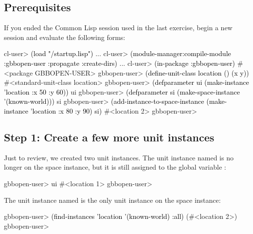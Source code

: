 \documentclass[10pt,twoside,english,pdftex]{article}
\begin{document}
\fndocrule

\subsection*{Prerequisites}

%
%
%
If you ended the Common Lisp session used in the last exercise, begin a new
session and evaluate the following forms:
%
\W\supp
\begin{example}
\textcolor{darkergray}{%
  cl-user> \textcolor{black}{(load "/startup.lisp")}
     ...
  cl-user> \textcolor{black}{(module-manager:compile-module :gbbopen-user :propagate :create-dirs)}
     ...
  cl-user> \textcolor{black}{(in-package :gbbopen-user)}
  #<package GBBOPEN-USER>
  gbbopen-user> \textcolor{black}{(define-unit-class location ()
                   (x y))}
  #<standard-unit-class location>
  gbbopen-user> \textcolor{black}{(defparameter ui (make-instance 'location :x 50 :y 60))}
  ui
  gbbopen-user> \textcolor{black}{(defparameter si (make-space-instance '(known-world)))}
  si
  gbbopen-user> \textcolor{black}{(add-instance-to-space-instance 
                   (make-instance 'location :x 80 :y 90)
                   si)}
  #<location 2>
  gbbopen-user>}
\end{example}

\subsection*{Step 1: Create a few more unit instances}

Just to review, we created two  unit instances.  The
unit instance named  is no longer on the 
space instance, but it is still assigned to the global variable :
%
%
\W\supp
\begin{example}
\textcolor{darkergray}{%
  gbbopen-user> \textcolor{black}{ui}
  #<location 1> 
  gbbopen-user>}
\end{example}
%
The  unit instance named  is the only
 unit instance on the  space
instance:
%
%
\W\supp\notpretop
\begin{example}
\textcolor{darkergray}{%
  gbbopen-user> \textcolor{black}{(find-instances 'location '(known-world) :all)}
  (#<location 2>)
  gbbopen-user>}
\end{example}
\end{document}
